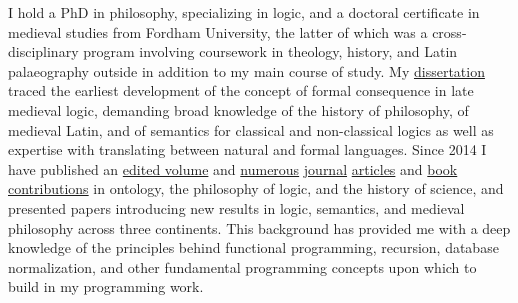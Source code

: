 I hold a PhD in philosophy, specializing in logic, and a doctoral certificate in medieval studies from Fordham University, the latter of which was a cross-disciplinary program involving coursework in theology, history, and Latin palaeography outside in addition to my main course of study. 
My \href{https://www.academia.edu/32939933/The_development_of_the_medieval_Parisian_account_of_formal_consequence}{dissertation} traced the earliest development of the concept of formal consequence
in late medieval logic, demanding 
broad knowledge 
of the history of philosophy, 
of medieval Latin, 
and 
of semantics for classical and non-classical logics 
as well as  
expertise with translating between natural and formal languages. 
Since 2014 I have published an \href{https://brill.com/view/journals/viv/56/3-4/viv.56.issue-3-4.xml?language=en}{edited volume} and  
\href{https://link.springer.com/article/10.1007/s11787-019-00229-x}{numerous} \href{https://link.springer.com/article/10.1007/s11787-017-0162-7}{journal} \href{https://www.jstor.org/stable/43658430}{articles} and  \href{https://www.cambridgescholars.com/download/sample/64716}{book} \href{http://www.collegepublications.co.uk/dialogues/?00005}{contributions}
in 
ontology, 
the philosophy of logic, 
and the history of science, 
and presented papers introducing new results in logic, semantics, and medieval philosophy across three continents. This background has provided me with a deep knowledge of the principles behind functional programming, recursion, database normalization, and other fundamental programming concepts upon which to build in my programming work.
